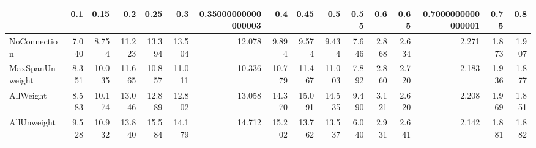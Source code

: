 \begin{tabular}{lrrrrrrrrrrrrrrr}
\toprule
{} &   0.1 &   0.15 &    0.2 &   0.25 &    0.3 & 0.35000000000000003 &    0.4 &   0.45 &    0.5 &  0.55 &   0.6 &  0.65 & 0.7000000000000001 &  0.75 &   0.8 \\
\midrule
NoConnection    & 7.040 &  8.754 & 11.223 & 13.394 & 13.504 &              12.078 &  9.894 &  9.574 &  9.434 & 7.646 & 2.868 & 2.634 &              2.271 & 1.873 & 1.907 \\
MaxSpanUnweight & 8.351 & 10.035 & 11.665 & 10.857 & 11.011 &              10.336 & 10.779 & 11.467 & 11.003 & 7.892 & 2.860 & 2.720 &              2.183 & 1.936 & 1.877 \\
AllWeight       & 8.583 & 10.174 & 13.046 & 12.889 & 12.802 &              13.058 & 14.370 & 15.091 & 14.535 & 9.490 & 3.121 & 2.620 &              2.208 & 1.969 & 1.851 \\
AllUnweight     & 9.528 & 10.932 & 13.840 & 15.584 & 14.179 &              14.712 & 15.202 & 13.762 & 13.537 & 6.040 & 2.931 & 2.641 &              2.142 & 1.881 & 1.882 \\
\bottomrule
\end{tabular}
